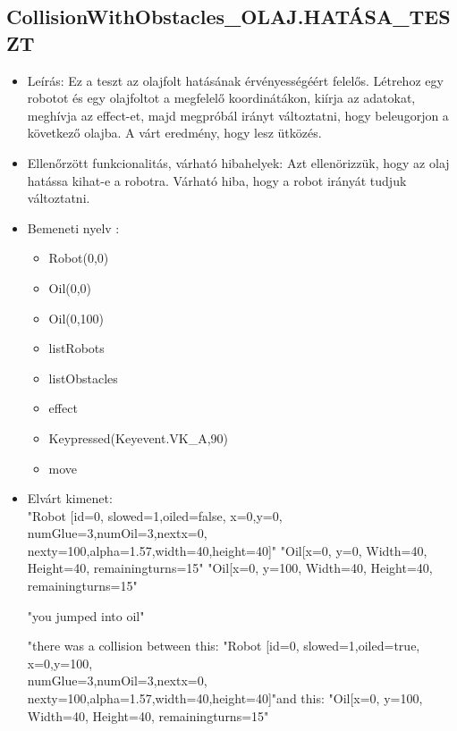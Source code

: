 \subsection{CollisionWithObstacles\_OLAJ.HATÁSA\_TESZT}
\begin{itemize}
	\item Leírás: Ez a teszt az olajfolt hatásának érvényességéért felelős. Létrehoz egy robotot és egy olajfoltot a megfelelő koordinátákon, kiírja az adatokat, meghívja az effect-et, majd megpróbál irányt változtatni, hogy beleugorjon a következő olajba. A várt eredmény, hogy lesz ütközés.
\newline
	\item  Ellenőrzött funkcionalitás, várható hibahelyek: Azt ellenörizzük, hogy az olaj hatássa kihat-e a robotra.
		   Várható hiba, hogy a robot irányát tudjuk változtatni.
	\item Bemeneti nyelv :
		\begin{itemize}
		\item Robot(0,0)
		\item Oil(0,0)
		\item Oil(0,100)
		\item listRobots
		\item listObstacles
		\item effect
		\item Keypressed(Keyevent.VK\_A,90)
		\item move
		\end{itemize}
	
	\item Elvárt kimenet: \\
		"Robot [id=0,  slowed=1,oiled=false, x=0,y=0, 
		\\numGlue=3,numOil=3,nextx=0,
		\\nexty=100,alpha=1.57,width=40,height=40]"\newline
		"Oil[x=0, y=0, Width=40, Height=40, remainingturns=15"\newline
			"Oil[x=0, y=100, Width=40, Height=40, remainingturns=15"\newline
			
			"you jumped into oil"\newline
		
		"there was a collision between this: "Robot [id=0,  slowed=1,oiled=true, x=0,y=100, 
		\\numGlue=3,numOil=3,nextx=0,
		\\nexty=100,alpha=1.57,width=40,height=40]"\newline and this: "Oil[x=0, y=100, Width=40, Height=40, remainingturns=15"\newline
\end{itemize}

